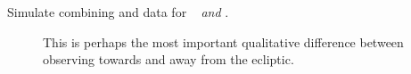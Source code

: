 \begin{description}
	\item[Simulate combining \tess and \ktwo data for \rm{\elong\ } \textit{and} \rm{\eshort}.] 
	This is perhaps the most important qualitative difference between observing towards and away from the ecliptic.
	
\end{description}

\newpage













